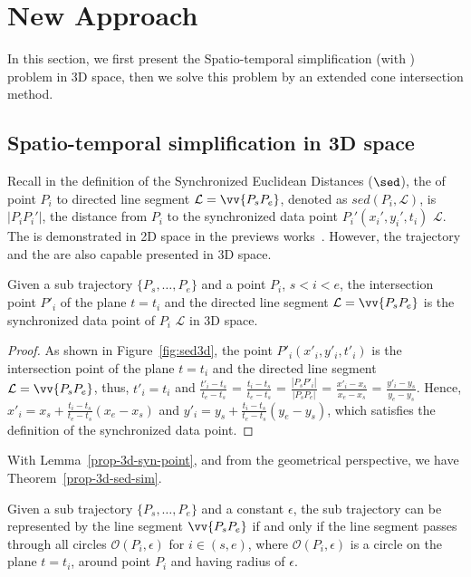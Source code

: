 \section{New Approach}

In this section, we first present the Spatio-temporal simplification (with \sed) problem in 3D space, then we solve this problem by an extended cone intersection method.
\subsection{Spatio-temporal simplification in 3D space}

Recall in the definition of the Synchronized Euclidean Distances ($\sed$), the \sed of point $P_i$ to directed line segment $\mathcal{L} = \vv{P_{s}P_{e}}$, denoted as $sed(P_i, \mathcal{L})$, is $|P_iP_i'|$, the distance from $P_i$ to the synchronized data point $P_i' (x_i', y_i', t_i)$ \wrt $\mathcal{L}$.
The \sed is demonstrated in 2D space in the previews works~\cite{Meratnia:Spatiotemporal, Chen:Fast, Muckell:Compression, Popa:Spatio}. However,  the trajectory and the \sed are also capable presented in 3D space.

\begin{llemma}
\label{prop-3d-syn-point}
Given a sub trajectory $\{P_s, \ldots, P_e\}$ and a point $P_i$, $s<i<e$, the intersection point $P'_i$ of the plane $t=t_i$ and the directed line segment $\mathcal{L} = \vv{P_sP_e}$ is the synchronized data point of $P_i$ \wrt $\mathcal{L}$ in 3D space.
\end{llemma}

\begin{proof}
As shown in Figure~\ref{fig:sed3d}, the point $P'_i (x'_i, y'_i, t'_i)$ is the intersection point of the plane $t=t_i$ and the directed line segment $\mathcal{L} = \vv{P_sP_e}$, thus, $t'_i = t_i$ and $\frac{t'_i - t_s}{t_e - t_s}$ = $\frac{t_i - t_s}{t_e - t_s}$  = $\frac{|P_sP'_i|}{|P_sP_e|}$ = $\frac{x'_i - x_s}{x_e - x_s}$ = $\frac{y'_i - y_s}{y_e - y_s}$. Hence, $x'_i = x_s +  \frac{t_i-t_s}{t_e - t_s}(x_e - x_s)$ and $y'_i = y_s +  \frac{t_i - t_s}{t_e - t_s}(y_e - y_s)$, which satisfies the definition of the synchronized data point.
\end{proof}

With Lemma~\ref{prop-3d-syn-point}, and from the geometrical perspective, we have Theorem~\ref{prop-3d-sed-sim}.

\begin{ttheorem}
\label{prop-3d-sed-sim}
Given a sub trajectory $\{P_s, \ldots, P_e\}$ and a constant $\epsilon$, the sub trajectory can be represented by the line segment $\vv{P_sP_e}$ if and only if the line segment passes through all circles $\mathcal{O}(P_i, \epsilon)$ for $i \in (s, e)$, where $\mathcal{O}(P_i, \epsilon)$ is a circle on the plane $t=t_i$, around point $P_i$ and having radius of $\epsilon$.
\end{ttheorem}

